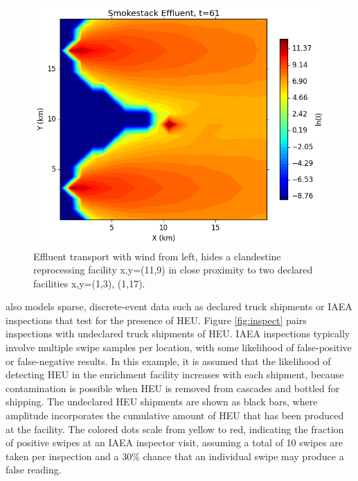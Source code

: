 \begin{figure}%
\begin{center}
\includegraphics[natwidth=162bp,natheight=227bp, scale=0.4]{./figs/proper_diff_fr61.png}
\end{center}
\caption{Effluent transport with wind from left, hides a clandestine reprocessing facility x,y=(11,9) in close proximity to two declared facilities x,y=(1,3), (1,17).}
\label{fig:effluent}
\end{figure}

\Cyclus also models sparse, discrete-event data such as declared truck shipments or IAEA inspections that test for the presence of \gls{HEU}. Figure \ref{fig:inspect} pairs inspections with undeclared truck shipments of \gls{HEU}.  IAEA inspections typically involve multiple swipe samples per location, with some likelihood of false-positive or false-negative results\cite{ryjinski_idms_2003}. In this example, it is assumed that the likelihood of detecting \gls{HEU} in the enrichment facility increases with each shipment, because contamination is possible when \gls{HEU} is removed from cascades and bottled for shipping.  The undeclared \gls{HEU} shipments are shown as black bars, where amplitude incorporates the cumulative amount of \gls{HEU} that has been produced at the facility. The colored dots scale from yellow to red, indicating the fraction of positive swipes at an \gls{IAEA} inspector visit, assuming a total of 10 swipes are taken per inspection and a 30\% chance that an individual swipe may produce a false reading.  

